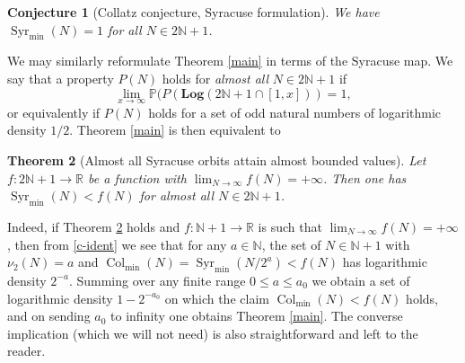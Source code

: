 \documentclass[12pt,a4paper,reqno]{amsart}
\numberwithin{equation}{section}
\theoremstyle{plain}
\newtheorem{theorem}{Theorem}[section]
\newtheorem{conjecture}[theorem]{Conjecture}
\theoremstyle{definition}
\renewcommand\P{\mathbb{P}}
\newcommand\R{\mathbb{R}}
\newcommand\N{\mathbb{N}}
\newcommand\Log{\mathbf{Log}}
\newcommand\Col{{\operatorname{Col}}}
\newcommand\Syr{{\operatorname{Syr}}}
\begin{document}
\begin{conjecture}[Collatz conjecture, Syracuse formulation]\label{collatz-syr}  We have $\Syr_{\min}(N)=1$ for all $N \in 2\N+1$.
\end{conjecture}

We may similarly reformulate Theorem \ref{main} in terms of the Syracuse map.  We say that a property $P(N)$ holds for \emph{almost all} $N \in 2\N+1$  if
$$ \lim_{x \to \infty} \P( P(\Log( 2\N+1 \cap [1,x] ) ) = 1,$$
or equivalently if $P(N)$ holds for a set of odd natural numbers of logarithmic density $1/2$.  Theorem \ref{main} is then equivalent to

\begin{theorem}[Almost all Syracuse orbits attain almost bounded values]\label{main-syr}  Let $f\colon 2\N + 1 \to \R$ be a function with $\lim_{N \to\infty} f(N) = +\infty$.  Then one has $\Syr_{\min}(N) < f(N)$ for almost all $N \in 2\N+1$.
\end{theorem}

Indeed, if Theorem \ref{main-syr} holds and $f\colon \N +1 \to \R$ is such that $\lim_{N \to \infty} f(N) = +\infty$, then from \eqref{c-ident} we see that for any $a \in \N$, the set of $N \in \N+1$ with $\nu_2(N) = a$ and $\Col_{\min}( N ) = \Syr_{\min}(N/2^a) < f(N)$ has logarithmic density $2^{-a}$.  Summing over any finite range $0 \leq a \leq a_0$ we obtain a set of logarithmic density $1 - 2^{-a_0}$ on which the claim $\Col_{\min}(N) < f(N)$ holds, and on sending $a_0$ to infinity one obtains Theorem \ref{main}.  The converse implication (which we will not need) is also straightforward and left to the reader.
\end{document}
